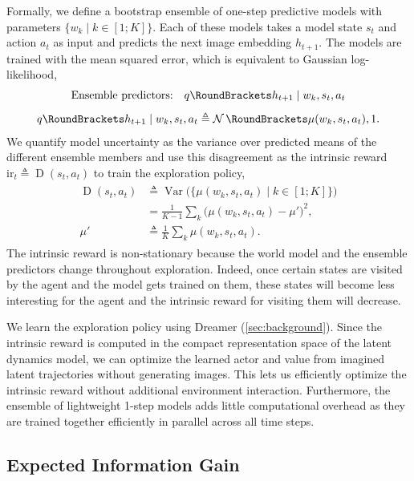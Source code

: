 \documentclass{article}
\begin{document}
Formally, we define a bootstrap ensemble of one-step predictive models with parameters $\{w_k \mid k \in [1;K]\}$. Each of these models takes a model state $s_t$ and action $a_t$ as input and predicts the next image embedding $h_{t+1}$. The models are trained with the mean squared error, which is equivalent to Gaussian log-likelihood,
\begin{gather}
\begin{gathered}
\text{Ensemble predictors:} \quad \q(h_{t+1}|w_k,s_t,a_t) \\[1ex]
\q(h_{t+1}|w_k,s_t,a_t) \triangleq \Normal(\mu(w_k,s_t,a_t), 1).
\end{gathered}
\label{eq:ensemble}
\end{gather}%
We quantify model uncertainty as the variance over predicted means of the different ensemble members and use this disagreement as the intrinsic reward $\mathrm{ir}_t \triangleq \operatorname{D}(s_t,a_t)$ to train the exploration policy,
\begin{gather}
\begin{aligned}
\operatorname{D}(s_t,a_t) &\triangleq \operatorname{Var}\big( \{\mu(w_k,s_t,a_t) \mid k \in [1;K] \}\big) \\
&= \frac{1}{K-1}\sum_k\big( \mu(w_k,s_t,a_t)-\mu'\big)^2, \\
\mu' &\triangleq \frac{1}{K}\sum_k\mu(w_k,s_t,a_t).
\end{aligned}
\end{gather}%
The intrinsic reward is non-stationary because the world model and the ensemble predictors change throughout exploration. Indeed, once certain states are visited by the agent and the model gets trained on them, these states will become less interesting for the agent and the intrinsic reward for visiting them will decrease.

We learn the exploration policy using Dreamer (\cref{sec:background}). Since the intrinsic reward is computed in the compact representation space of the latent dynamics model, we can optimize the learned actor and value from imagined latent trajectories without generating images. This lets us efficiently optimize the intrinsic reward without additional environment interaction. Furthermore, the ensemble of lightweight 1-step models adds little computational overhead as they are trained together efficiently in parallel across all time steps.

\subsection{Expected Information Gain}
\end{document}
